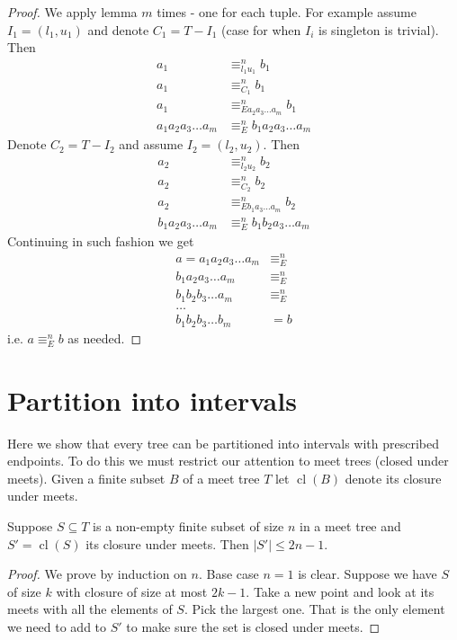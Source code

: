 \documentclass{amsart}
\DeclareMathOperator{\cl}{cl}
\begin{document}
\begin{proof}
	We apply lemma $m$ times - one for each tuple. For example assume $I_1 = (l_1, u_1)$ and denote $C_1 = T - I_1$ (case for when $I_i$ is singleton is trivial). Then
	\begin{align*}
		a_1 &\equiv^n_{l_1u_1} b_1 \\
		a_1 &\equiv^n_{C_1} b_1 \\
		a_1 &\equiv^n_{Ea_2a_3\ldots a_m} b_1 \\
		a_1a_2a_3\ldots a_m &\equiv^n_{E} b_1a_2a_3\ldots a_m
	\end{align*}
	Denote $C_2 = T - I_2$ and assume $I_2 = (l_2, u_2)$. Then
	\begin{align*} 
		a_2 &\equiv^n_{l_2u_2} b_2 \\
		a_2 &\equiv^n_{C_2} b_2 \\
		a_2 &\equiv^n_{Eb_1a_3\ldots a_m} b_2 \\
		b_1a_2a_3\ldots a_m &\equiv^n_{E} b_1b_2a_3\ldots a_m
	\end{align*}
	Continuing in such fashion we get
	\begin{align*}
		a = a_1a_2a_3\ldots a_m &\equiv^n_{E} \\
		    b_1a_2a_3\ldots a_m &\equiv^n_{E} \\
		    b_1b_2b_3\ldots a_m &\equiv^n_{E} \\
				\ldots \\
				b_1b_2b_3\ldots b_m &= b
	\end{align*}
	i.e. $a \equiv^n_{E} b$ as needed.
\end{proof}


\section {Partition into intervals}

Here we show that every tree can be partitioned into intervals with prescribed endpoints. To do this we must restrict our attention to meet trees (closed under meets). Given a finite subset $B$ of a meet tree $T$ let $\cl(B)$ denote its closure under meets.

\begin{Lemma} \label{lm_meet}
	Suppose $S \subseteq T$ is a non-empty finite subset of size $n$ in a meet tree and $S' = \cl(S)$ its closure under meets. Then $|S'| \leq 2n - 1$.
\end{Lemma}
\begin{proof}
	We prove by induction on $n$. Base case $n = 1$ is clear. Suppose we have $S$ of size $k$ with closure of size at most $2k - 1$. Take a new point and look at its meets with all the elements of $S$. Pick the largest one. That is the only element we need to add to $S'$ to make sure the set is closed under meets.
\end{proof}
\end{document}
